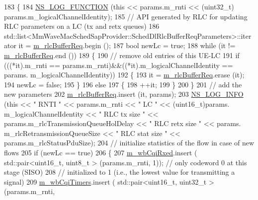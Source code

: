 \begin{DoxyCode}
183 \{
184   \hyperlink{log-macros-disabled_8h_a90b90d5bad1f39cb1b64923ea94c0761}{NS\_LOG\_FUNCTION} (\textcolor{keyword}{this} << params.m\_rnti << (uint32\_t) params.m\_logicalChannelIdentity);
185   \textcolor{comment}{// API generated by RLC for updating RLC parameters on a LC (tx and retx queues)}
186   std::list<MmWaveMacSchedSapProvider::SchedDlRlcBufferReqParameters>::iterator it = 
      \hyperlink{classns3_1_1MmWaveRrMacScheduler_a4808ca626b0b12682c3f1a079d016997}{m\_rlcBufferReq}.begin ();
187   \textcolor{keywordtype}{bool} newLc = \textcolor{keyword}{true};
188   \textcolor{keywordflow}{while} (it != \hyperlink{classns3_1_1MmWaveRrMacScheduler_a4808ca626b0b12682c3f1a079d016997}{m\_rlcBufferReq}.end ())
189     \{
190       \textcolor{comment}{// remove old entries of this UE-LC}
191       \textcolor{keywordflow}{if} (((*it).m\_rnti == params.m\_rnti)&&((*it).m\_logicalChannelIdentity == params.
      m\_logicalChannelIdentity))
192         \{
193           it = \hyperlink{classns3_1_1MmWaveRrMacScheduler_a4808ca626b0b12682c3f1a079d016997}{m\_rlcBufferReq}.erase (it);
194           newLc = \textcolor{keyword}{false};
195         \}
196       \textcolor{keywordflow}{else}
197         \{
198           ++it;
199         \}
200     \}
201   \textcolor{comment}{// add the new parameters}
202   \hyperlink{classns3_1_1MmWaveRrMacScheduler_a4808ca626b0b12682c3f1a079d016997}{m\_rlcBufferReq}.insert (it, params);
203   \hyperlink{group__logging_gafbd73ee2cf9f26b319f49086d8e860fb}{NS\_LOG\_INFO} (\textcolor{keyword}{this} << \textcolor{stringliteral}{" RNTI "} << params.m\_rnti << \textcolor{stringliteral}{" LC "} << (uint16\_t)params.
      m\_logicalChannelIdentity << \textcolor{stringliteral}{" RLC tx size "} << params.m\_rlcTransmissionQueueHolDelay << \textcolor{stringliteral}{" RLC retx size "} << params.
      m\_rlcRetransmissionQueueSize << \textcolor{stringliteral}{" RLC stat size "} <<  params.m\_rlcStatusPduSize);
204   \textcolor{comment}{// initialize statistics of the flow in case of new flows}
205   \textcolor{keywordflow}{if} (newLc == \textcolor{keyword}{true})
206   \{
207         \hyperlink{classns3_1_1MmWaveRrMacScheduler_ab048c846f6d5d71795b65b9f91c6766a}{m\_wbCqiRxed}.insert ( std::pair<uint16\_t, uint8\_t > (params.m\_rnti, 1)); \textcolor{comment}{// only codeword
       0 at this stage (SISO)}
208         \textcolor{comment}{// initialized to 1 (i.e., the lowest value for transmitting a signal)}
209         \hyperlink{classns3_1_1MmWaveRrMacScheduler_ae70383b2b2b66701ea96205d5ad60c41}{m\_wbCqiTimers}.insert ( std::pair<uint16\_t, uint32\_t > (params.m\_rnti, 

\end{DoxyCode}
